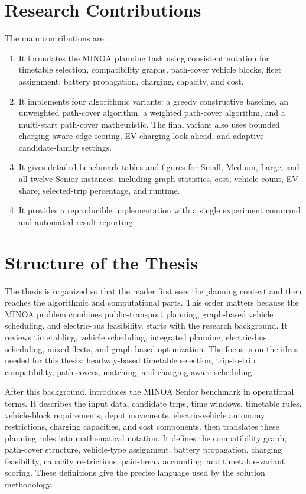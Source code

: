 \section{Research Contributions}

The main contributions are:

\begin{enumerate}
    \item It formulates the MINOA planning task using consistent notation for
    timetable selection, compatibility graphs, path-cover vehicle blocks,
    fleet assignment, battery propagation, charging, capacity, and cost.
    \item It implements four algorithmic variants: a greedy constructive
    baseline, an unweighted path-cover algorithm, a weighted path-cover
    algorithm, and a multi-start path-cover matheuristic. The final variant
    also uses bounded charging-aware edge scoring, EV charging look-ahead, and
    adaptive candidate-family settings.
    \item It gives detailed benchmark tables and figures for Small, Medium,
    Large, and all twelve Senior instances, including graph statistics, cost,
    vehicle count, EV share, selected-trip percentage, and runtime.
    \item It provides a reproducible implementation with a single experiment
    command and automated result reporting.
\end{enumerate}

\clearpage
\section{Structure of the Thesis}

The thesis is organized so that the reader first sees the planning context and
then reaches the algorithmic and computational parts.  This order matters
because the MINOA problem combines public-transport planning, graph-based
vehicle scheduling, and electric-bus feasibility.  
starts with the research background.  It reviews timetabling, vehicle
scheduling, integrated planning, electric-bus scheduling, mixed fleets, and
graph-based optimization.  The focus is on the ideas needed for this thesis:
headway-based timetable selection, trip-to-trip compatibility, path covers,
matching, and charging-aware scheduling.

After this background,  introduces the MINOA Senior
benchmark in operational terms.  It describes the input data, candidate trips,
time windows, timetable rules, vehicle-block requirements, depot movements,
electric-vehicle autonomy restrictions, charging capacities, and cost
components.   then translates these planning rules into
mathematical notation.  It defines the compatibility graph, path-cover
structure, vehicle-type assignment, battery propagation, charging feasibility,
capacity restrictions, paid-break accounting, and timetable-variant scoring.
These definitions give the precise language used by the solution methodology.

